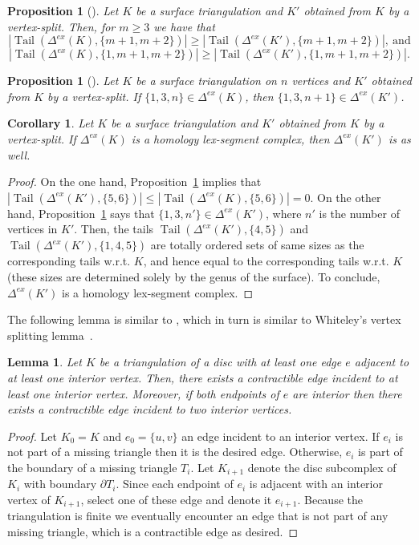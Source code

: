 \documentclass[reqno,english]{amsart}
\newtheorem{lemma}[theorem]{Lemma}
\newtheorem{proposition}[theorem]{Proposition}
\newtheorem{corollary}[theorem]{Corollary}
\numberwithin{claimcounter}{theorem}
\theoremstyle{remark}
\theoremstyle{definition}
\numberwithin{theorem}{section}
\DeclareMathOperator{\tail}{Tail}
\newcommand{\exshift}[1]{\Delta^{ex}(#1)}
\begin{document}
\begin{proposition}[\cite{keehn24-exterior}]
  \label{p:splittail}
  Let $K$ be a surface triangulation and $K'$ obtained from $K$ by a vertex-split.
  Then, for $m\geq 3$ we have that
  $$|\tail(\exshift{K},\{m+1,m+2\})| \geq |\tail(\exshift{K'}, \{m+1,m+2\})|,~\text{and}$$
  $$|\tail(\exshift{K},\{1,m+1,m+2\})| \geq |\tail(\exshift{K'}, \{1,m+1,m+2\})|.$$
\end{proposition}

\begin{proposition}[\cite{bulavka23-rigidity}]
  \label{p:splitvolume}
  Let $K$ be a surface triangulation on $n$ vertices and $K'$ obtained from $K$ by a vertex-split.
  If $\{1,3,n\}\in \exshift K$, then $\{1,3,n+1\}\in \exshift{K'}$.
\end{proposition}

\begin{corollary}
\label{c:splithlex}
  Let $K$ be a surface triangulation and $K'$ obtained from $K$ by a vertex-split.
  If $\exshift K$ is a homology lex-segment complex, then $\exshift{K'}$ is as well.
\end{corollary}
\begin{proof}
  On the one hand, Proposition~\ref{p:splittail} implies that $|\tail(\exshift{K'},\{5,6\})|\leq |\tail(\exshift{K},\{5,6\})|=0.$
  On the other hand, Proposition~\ref{p:splitvolume} says that $\{1,3,n'\}\in \exshift{K'}$, where $n'$ is the number of vertices in $K'$.
  Then, the tails $\tail(\exshift{K'},\{4,5\})$ and $\tail(\exshift{K'},\{1,4,5\})$ are totally ordered sets 
  of same sizes as the corresponding tails w.r.t. $K$, and hence equal to the corresponding tails w.r.t. $K$
  (these sizes are determined solely by the genus of the surface). To conclude, $\exshift{K'}$ is a homology lex-segment complex.
\end{proof}

The following lemma is similar to \cite[Lemma 4.10]{keehn24-exterior}, which in turn is similar to Whiteley's vertex splitting lemma~\cite{whiteley90-split}.  
\begin{lemma}
  \label{l:interior-edge}
  Let $K$ be a triangulation of a disc with at least one edge $e$ adjacent to at least one interior vertex. 
  Then, there exists a contractible edge incident to at least one interior vertex.
  Moreover, if both endpoints of $e$ are interior then there exists a contractible edge incident to two interior vertices.
\end{lemma}
\begin{proof}
  Let $K_0 = K$ and $e_0=\{u,v\}$ an edge incident to an interior vertex.
  If $e_i$ is not part of a missing triangle then it is the desired edge.
  Otherwise, $e_i$ is part of the boundary of a missing triangle $T_i$.
  Let $K_{i+1}$ denote the disc subcomplex of $K_i$ with boundary $\partial T_i$.
  Since each endpoint of $e_i$ is adjacent with an interior vertex of $K_{i+1}$, 
  select one of these edge and denote it $e_{i+1}$. Because the triangulation is finite
  we eventually encounter an edge that is not part of any missing triangle, which is a contractible edge as desired.
\end{proof}
\end{document}
